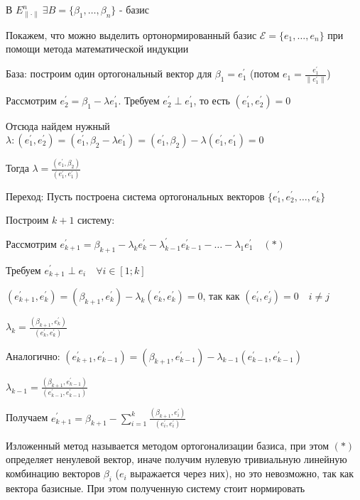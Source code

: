 \documentclass[12pt]{article}
\begin{document}
    \begin{MyProof}
        В $E^n_{\|\cdot\|} \ \exists B = \{\beta_1, \dots, \beta_n\}$ - базис

        Покажем, что можно выделить ортонормированный базис $\mathcal{E} = \{e_1, \dots, e_n\}$ при помощи метода
        математической индукции

        База: построим один ортогональный вектор для $\beta_1 = e_1^\prime$ (потом $e_1 = \frac{e_1^\prime}{\|e_1^\prime\|}$)

        Рассмотрим $e_2^\prime = \beta_1 - \lambda e^\prime_1$. Требуем $e_2^\prime \perp e_1^\prime$, то есть $(e_1^\prime, e_2^\prime) = 0$

        Отсюда найдем нужный $\lambda: (e_1^\prime, e_2^\prime) = (e_1^\prime, \beta_2 - \lambda e_1^\prime) = (e_1^\prime, \beta_2) - \lambda (e_1^\prime, e_1^\prime) = 0$

        Тогда $\lambda = \frac{(e_1^\prime, \beta_2)}{(e_1^\prime, e_1^\prime)}$

        Переход: Пусть построена система ортогональных векторов $\{e_1^\prime, e_2^\prime, \dots, e_k^\prime\}$

        Построим $k + 1$ систему:

        Рассмотрим $e_{k+1}^\prime = \beta_{k + 1} - \lambda_k e_k^\prime - \lambda_{k - 1}^\prime e_{k - 1}^\prime - \dots - \lambda_1 e_1^\prime \quad (*)$

        Требуем $e_{k+1}^\prime \perp e_i \quad \forall i \in [1;k]$

        $(e_{k+1}^\prime, e_k^\prime) = (\beta_{k + 1}, e_k^\prime) - \lambda_k (e_k^\prime, e_k^\prime) = 0$, так как $(e_i^\prime, e_j^\prime) = 0 \quad i \neq j$

        $\lambda_k = \frac{(\beta_{k + 1}, e_k^\prime)}{(e_k^\prime, e_k^\prime)}$

        Аналогично: $(e_{k+1}^\prime, e_{k - 1}^\prime) = (\beta_{k+1}, e_{k - 1}^\prime) - \lambda_{k - 1}(e_{k - 1}^\prime, e_{k-1}^\prime)$

        $\lambda_{k - 1} = \frac{(\beta_{k + 1}, e_{k - 1}^\prime)}{(e_{k - 1}^\prime, e_{k - 1}^\prime)}$

        Получаем $e_{k+1}^\prime = \beta_{k + 1} - \sum_{i = 1}^k \frac{(\beta_{k + 1}, e_{i}^\prime)}{(e_{i}^\prime, e_{i}^\prime)}$
    \end{MyProof}

    Изложенный метод называется методом ортогонализации базиса, при этом $(*)$ определяет ненулевой вектор, 
    иначе получим нулевую тривиальную линейную комбинацию векторов $\beta_i$ ($e_i$ выражается через них), но это невозможно, 
    так как вектора базисные.
    При этом полученную систему стоит нормировать
\end{document}
